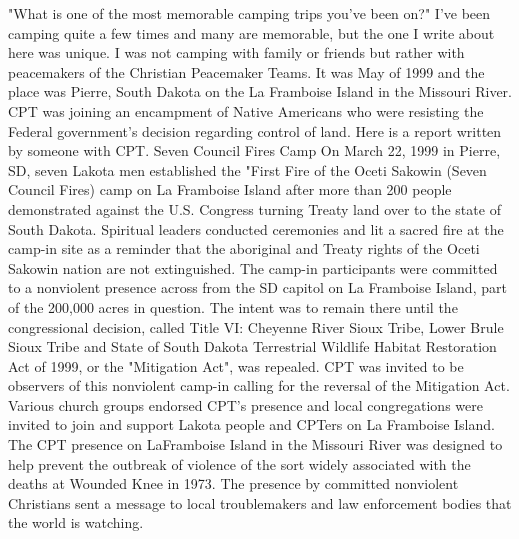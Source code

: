 "What is one of the most memorable camping trips you've been on?"
I've been camping quite a few times and many are memorable, but the one I write about here was unique. I was not camping with family or friends but rather with peacemakers of the Christian Peacemaker Teams. It was May of 1999 and the place was Pierre, South Dakota on the La Framboise Island in the Missouri River. CPT was joining an encampment of Native Americans who were resisting the Federal government's decision regarding control of land. 
Here is a report written by someone with CPT.
Seven Council Fires Camp
On March 22, 1999 in Pierre, SD, seven Lakota men established the "First Fire of the Oceti Sakowin (Seven Council Fires) camp on La Framboise Island after more than 200 people demonstrated against the U.S. Congress turning Treaty land over to the state of South Dakota. Spiritual leaders conducted ceremonies and lit a sacred fire at the camp-in site as a reminder that the aboriginal and Treaty rights of the Oceti Sakowin nation are not extinguished. The camp-in participants were committed to a nonviolent presence across from the SD capitol on La Framboise Island, part of the 200,000 acres in question. The intent was to remain there until the congressional decision, called Title VI: Cheyenne River Sioux Tribe, Lower Brule Sioux Tribe and State of South Dakota Terrestrial Wildlife Habitat Restoration Act of 1999, or the "Mitigation Act", was repealed. 
CPT was invited to be observers of this nonviolent camp-in calling for the reversal of the Mitigation Act. Various church groups endorsed CPT's presence and local congregations were invited to join and support Lakota people and CPTers on La Framboise Island.  
The CPT presence on LaFramboise Island in the Missouri River was designed to help prevent the outbreak of violence of the sort widely associated with the deaths at Wounded Knee in 1973. The presence by committed nonviolent Christians sent a message to local troublemakers and law enforcement bodies that the world is watching.

